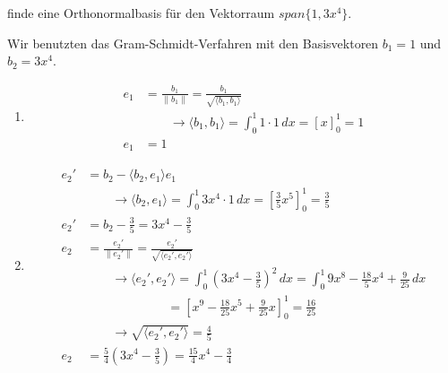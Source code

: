finde eine Orthonormalbasis für den Vektorraum \( span \{ 1, 3x^4 \} \).

\vspace{1\baselineskip}

Wir benutzten das Gram-Schmidt-Verfahren mit den Basisvektoren \( b_1 = 1 \) und \( b_2 = 3x^4 \).

\begin{enumerate}
    \item 
    \begin{equation*}
        \begin{aligned}
            e_1 &= \frac{b_1}{\| b_1 \|} = \frac{b_1}{\sqrt{\langle b_1, b_1 \rangle}} \\[1em]
            & \qquad \to \langle b_1, b_1 \rangle = \int_{0}^{1} 1 \cdot 1 \, dx = \left[ x \right]_0^1 = 1 \\[1em]
            e_1 &= 1
        \end{aligned}
    \end{equation*}
    \item 
    \begin{equation*}
        \begin{aligned}
            e_2' &= b_2 - \langle b_2, e_1 \rangle e_1 \\[1em]
            & \qquad \to \langle b_2, e_1 \rangle = \int_{0}^{1} 3x^4 \cdot 1 \, dx = \left[ \frac{3}{5} x^5 \right]_0^1 = \frac{3}{5} \\[1em]
            e_2' &= b_2 - \frac{3}{5} = 3x^4 - \frac{3}{5} \\[2em]
            e_2 &= \frac{e_2'}{\| e_2' \|} = \frac{e_2'}{\sqrt{\langle e_2', e_2' \rangle}} \\[1em]
            & \qquad \to \langle e_2', e_2' \rangle = \int_{0}^{1} \left( 3x^4 - \frac{3}{5} \right)^2 \, dx = \int_{0}^{1} 9x^8 - \frac{18}{5}x^4 + \frac{9}{25} \, dx \\[1em]
            & \qquad \qquad \qquad \ \ = \left[ x^9 - \frac{18}{25} x^5 + \frac{9}{25} x \right]_0^1 = \frac{16}{25} \\[1em]
            & \qquad \to \sqrt{\langle e_2', e_2' \rangle} = \frac{4}{5} \\[1em]
            e_2 &= \frac{5}{4} \left(3x^4 - \frac{3}{5} \right) = \frac{15}{4}x^4 - \frac{3}{4}
        \end{aligned}
    \end{equation*}
\end{enumerate}

\vspace{1\baselineskip}

